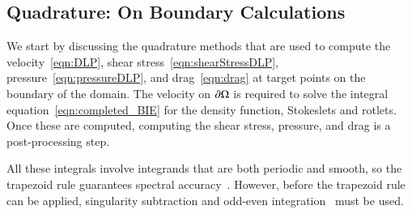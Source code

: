 \documentclass[preprint, 10pt]{elsarticle}
\begin{document}
\subsection{Quadrature: On Boundary Calculations} 
\label{sec:on_boundary}
We start by discussing the quadrature methods that are used to compute
the velocity~\eqref{eqn:DLP}, shear stress~\ref{eqn:shearStressDLP},
pressure~\eqref{eqn:pressureDLP}, and drag~\eqref{eqn:drag} at target
points on the boundary of the domain.  The velocity on ${\partial}\Omega$ is
required to solve the integral equation~\eqref{eqn:completed_BIE} for
the density function, Stokeslets and rotlets.  Once these are computed,
computing the shear stress, pressure, and drag is a post-processing
step.

All these integrals involve integrands that are both periodic and
smooth, so the trapezoid rule guarantees spectral
accuracy~\cite{tre-wei2014}.  However, before the trapezoid rule can be
applied, singularity subtraction and odd-even
integration~\cite{sid-isr1988} must be used.

\end{document}
